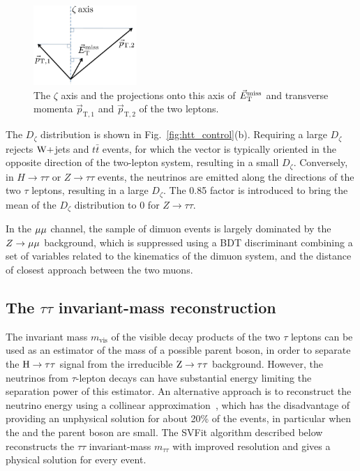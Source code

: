\documentclass[11pt,twoside,a4paper,cmspaper,final,collab]{cms-tdr}
\begin{document}
\begin{figure}[htbp]
\begin{center}
\includegraphics[width=0.35\textwidth]{figures/htt/zeta_drawing.pdf}
\end{center}
\caption{The $\zeta$ axis and the projections onto this axis of ${\vec E}_{\mathrm{T}}^{\text{miss}}$ and transverse momenta $\vec{p}_\mathrm{T,1}$ and $\vec{p}_\mathrm{T,2}$ of the two leptons.}
\label{fig:htt_zeta_drawing}
\end{figure}

The $D_{\zeta}$ distribution is shown in Fig.~\ref{fig:htt_control}(b).
Requiring a large $D_{\zeta}$ rejects $\mathrm{W}+$jets and $t\bar t$ events, for which the \MET vector is typically oriented in the opposite direction of the two-lepton system, resulting in a small $D_{\zeta}$.
Conversely, in $H\to \tau \tau$ or $Z \to \tau \tau$ events, the
neutrinos are emitted along the directions of the two $\tau$ leptons, resulting in a large $D_{\zeta}$. The 0.85 factor is introduced to bring the mean of the $D_{\zeta}$ distribution to 0 for $Z \to \tau \tau$.

In the ${\mu}{\mu}$ channel, the sample of dimuon events is largely dominated by the $Z\rightarrow{\mu}{\mu}$ background,
which is suppressed using a BDT discriminant combining a set of variables related to the kinematics of the dimuon system,
and the distance of closest approach between the two muons.

\subsection{The \texorpdfstring{$\tau\tau$}{tau tau} invariant-mass reconstruction}
\label{sec:htt_mtautau}

The invariant mass $m_\text{vis}$ of the visible decay products of the
two $\tau$ leptons can be used as an estimator of the mass of
a possible parent boson, in order
to separate the $\mathrm{H} \to \tau \tau$ signal from the irreducible $\mathrm{Z} \to \tau \tau$ background.
However, the neutrinos from $\tau$-lepton decays can have substantial energy
limiting the separation power of this estimator.
An alternative approach is to reconstruct the neutrino energy using a collinear approximation~\cite{massRecoCollinearApprox},
which has the disadvantage of providing an unphysical solution for about 20\% of the events, in particular when the \MET and the parent
boson \PT are small.
The SVFit algorithm described below reconstructs the $\tau\tau$ invariant-mass $m_{\tau\tau}$ with improved resolution and gives a physical solution for every event.
\end{document}
